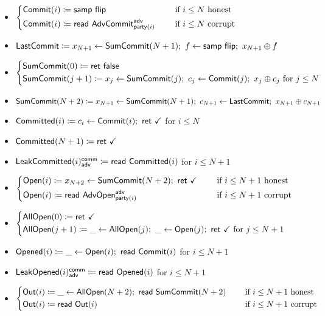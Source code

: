 \begin{itemize}
\item {\color{blue} $\begin{cases*} \Commit(i) \coloneqq \samp{\flip} & \hspace{10pt} \text{if $i \leq N$ honest} \\ \Commit(i) \coloneqq \read{\AdvCommit^\adv_{\party(i)}} & \hspace{10pt} \text{if $i \leq N$ corrupt} \end{cases*}$}
\item {\color{blue} $\mathsf{LastCommit} \coloneqq x_{N+1} \leftarrow \mathsf{SumCommit}(N+1); \ f \leftarrow \mathsf{samp} \ \mathsf{flip}; \ x_{N+1} \oplus f$}
\item {\color{blue} $\begin{cases*} \SumCommit(0) \coloneqq \ret{\false} \\ \SumCommit(j+1) \coloneqq x_j \leftarrow \SumCommit(j); \ c_j \leftarrow \Commit(j); \ x_j \oplus c_j \text{ for $j \leq N$} \end{cases*}$}
\item {\color{blue} $\SumCommit(N+2) \coloneqq x_{N+1} \leftarrow \SumCommit(N+1); \ c_{N+1} \leftarrow \LastCommit; \ x_{N+1} \oplus c_{N+1}$}
\item {\color{magenta} $\mathsf{Committed}(i) \coloneqq c_i \leftarrow \mathsf{Commit}(i); \ \mathsf{ret} \ \checkmark$ for $i \leq N$}
\item {\color{magenta} $\mathsf{Committed}(N+1) \coloneqq \mathsf{ret} \ \checkmark$}
\item {\color{magenta} $\mathsf{LeakCommitted}(i)^{\mathsf{comm}}_{\mathsf{adv}} \coloneqq \mathsf{read} \ \mathsf{Committed}(i)$ for $i \leq N+1$}
\item {\color{teal} $\begin{cases*} \Open(i) \coloneqq x_{N+2} \leftarrow \SumCommit(N+2); \ \ret{\checkmark} & \hspace{10pt} \text{if $i \leq N+1$ honest} \\ \Open(i) \coloneqq \read{\AdvOpen^\adv_{\party(i)}} & \hspace{10pt} \text{if $i \leq N+1$ corrupt} \end{cases*}$}
\item {\color{teal} $\begin{cases*} \AllOpen(0) \coloneqq \ret{\checkmark} \\ \AllOpen(j+1) \coloneqq \_ \leftarrow \AllOpen(j); \ \_ \leftarrow \Open(j); \ \ret{\checkmark} \text{ for $j \leq N+1$} \end{cases*}$}
\item {\color{red} $\mathsf{Opened}(i) \coloneqq \_ \leftarrow \mathsf{Open}(i); \ \mathsf{read} \ \mathsf{Commit}(i)$ for $i \leq N+1$}
\item {\color{red} $\mathsf{LeakOpened}(i)^{\mathsf{comm}}_{\mathsf{adv}} \coloneqq \mathsf{read} \ \mathsf{Opened}(i)$ for $i \leq N+1$}
\item $\begin{cases*} \Out(i) \coloneqq \_ \leftarrow \AllOpen(N+2); \ \read{\SumCommit(N+2)} & \hspace{10pt} \text{if $i \leq N+1$ honest} \\ \Out(i) \coloneqq \read{\Out(i)} & \hspace{10pt} \text{if $i \leq N+1$ corrupt} \end{cases*}$
\end{itemize}

